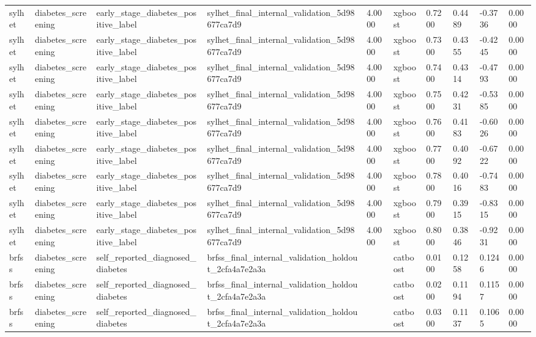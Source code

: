 \begin{tabular}{llllllllll}
sylhet & diabetes\_screening & early\_stage\_diabetes\_positive\_label & sylhet\_final\_internal\_validation\_5d98677ca7d9 & 4.0000 & xgboost & 0.7200 & 0.4489 & -0.3736 & 0.0000 \\
sylhet & diabetes\_screening & early\_stage\_diabetes\_positive\_label & sylhet\_final\_internal\_validation\_5d98677ca7d9 & 4.0000 & xgboost & 0.7300 & 0.4355 & -0.4245 & 0.0000 \\
sylhet & diabetes\_screening & early\_stage\_diabetes\_positive\_label & sylhet\_final\_internal\_validation\_5d98677ca7d9 & 4.0000 & xgboost & 0.7400 & 0.4314 & -0.4793 & 0.0000 \\
sylhet & diabetes\_screening & early\_stage\_diabetes\_positive\_label & sylhet\_final\_internal\_validation\_5d98677ca7d9 & 4.0000 & xgboost & 0.7500 & 0.4231 & -0.5385 & 0.0000 \\
sylhet & diabetes\_screening & early\_stage\_diabetes\_positive\_label & sylhet\_final\_internal\_validation\_5d98677ca7d9 & 4.0000 & xgboost & 0.7600 & 0.4183 & -0.6026 & 0.0000 \\
sylhet & diabetes\_screening & early\_stage\_diabetes\_positive\_label & sylhet\_final\_internal\_validation\_5d98677ca7d9 & 4.0000 & xgboost & 0.7700 & 0.4092 & -0.6722 & 0.0000 \\
sylhet & diabetes\_screening & early\_stage\_diabetes\_positive\_label & sylhet\_final\_internal\_validation\_5d98677ca7d9 & 4.0000 & xgboost & 0.7800 & 0.4016 & -0.7483 & 0.0000 \\
sylhet & diabetes\_screening & early\_stage\_diabetes\_positive\_label & sylhet\_final\_internal\_validation\_5d98677ca7d9 & 4.0000 & xgboost & 0.7900 & 0.3915 & -0.8315 & 0.0000 \\
sylhet & diabetes\_screening & early\_stage\_diabetes\_positive\_label & sylhet\_final\_internal\_validation\_5d98677ca7d9 & 4.0000 & xgboost & 0.8000 & 0.3846 & -0.9231 & 0.0000 \\
brfss & diabetes\_screening & self\_reported\_diagnosed\_diabetes & brfss\_final\_internal\_validation\_holdout\_2cfa4a7e2a3a &  & catboost & 0.0100 & 0.1258 & 0.1246 & 0.0000 \\
brfss & diabetes\_screening & self\_reported\_diagnosed\_diabetes & brfss\_final\_internal\_validation\_holdout\_2cfa4a7e2a3a &  & catboost & 0.0200 & 0.1194 & 0.1157 & 0.0000 \\
brfss & diabetes\_screening & self\_reported\_diagnosed\_diabetes & brfss\_final\_internal\_validation\_holdout\_2cfa4a7e2a3a &  & catboost & 0.0300 & 0.1137 & 0.1065 & 0.0000 \\

\end{tabular}
